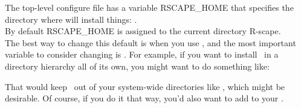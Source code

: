 The top-level configure file has a variable RSCAPE\_HOME that
specifies the directory where  will install
things: .\\

By default RSCAPE\_HOME is assigned to the current directory
R-scape.\\

The best way to change this default is when you use
, and the most important variable to consider
changing is . For example, if you want to install
\rscape\ in a directory hierarchy all of its own, you might want to do
something like:


That would keep \rscape\ out of your system-wide directories like
, which might be desirable. Of course, if you do
it that way, you'd also want to add  to
your .
